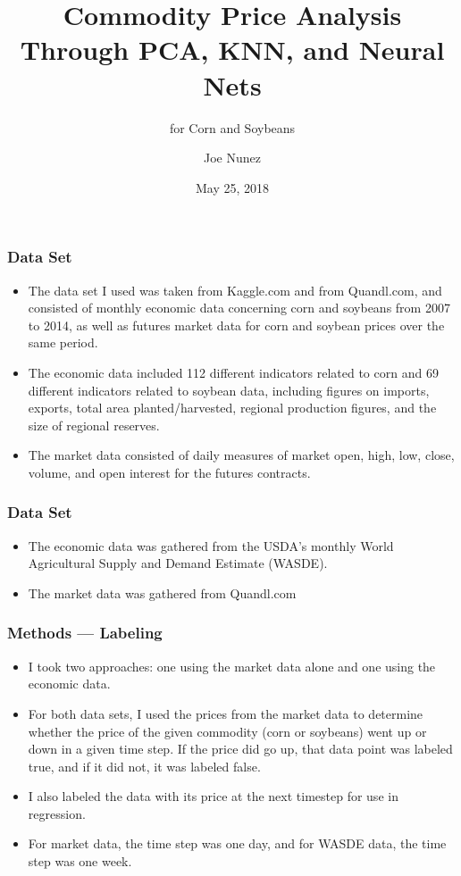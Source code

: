 \documentclass{beamer}
\title{Commodity Price Analysis Through PCA, KNN, and Neural Nets}
\subtitle{for Corn and Soybeans}
\author{Joe Nunez}
\institute{Harvey Mudd College}
\date{May 25, 2018}
\begin{document}
\begin{frame}
\titlepage
\end{frame}

\begin{frame}
\frametitle{Data Set}
\begin{itemize}
\item The data set I used was taken from Kaggle.com and from Quandl.com, and consisted of monthly economic data concerning corn and soybeans from 2007 to 2014, as well as futures market data for corn and soybean prices over the same period.
\item The economic data included 112 different indicators related to corn and 69 different indicators related to soybean data, including figures on imports, exports, total area planted/harvested, regional production figures, and the size of regional reserves. 

\item The market data consisted of daily measures of market open, high, low, close, volume, and open interest for the futures contracts.
\end{itemize}
\end{frame}


\begin{frame}
\frametitle{Data Set}
\begin{itemize}
\item The economic data was gathered from the USDA's monthly World Agricultural Supply and Demand Estimate (WASDE).
\item The market data was gathered from Quandl.com
\end{itemize}
\end{frame}


\begin{frame}
\frametitle{Methods --- Labeling}
\begin{itemize}
\item I took two approaches: one using the market data alone and one using the economic data.
\item For both data sets, I used the prices from the market data to determine whether the price of the given commodity (corn or soybeans) went up or down in a given time step.  If the price did go up, that data point was labeled true, and if it did not, it was labeled false.  
\item I also labeled the data with its price at the next timestep for use in regression.
\item For market data, the time step was one day, and for WASDE data, the time step was one week.
\end{itemize}
\end{frame}
\end{document}
